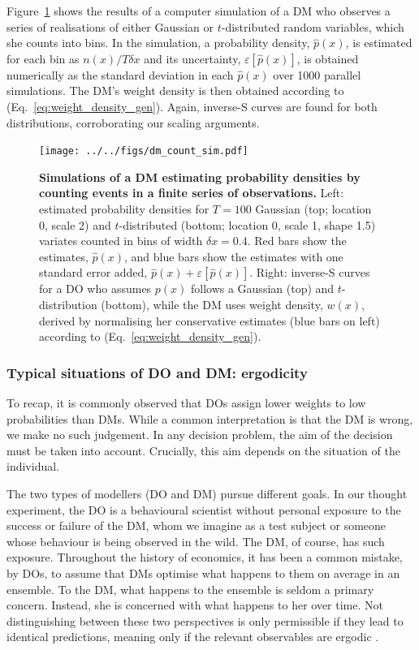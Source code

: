 \documentclass[12pt,letter,timesnewroman]{article}
\newcommand{\eref}[1]{(Eq.~\ref{eq:#1})}
\newcommand{\flabel}[1]{\label{fig:#1}}
\newcommand{\Fref}[1]{Figure~\ref{fig:#1}}
\newcommand{\err}[1]{\varepsilon\left[#1\right]}
\newcommand{\phat}{\hat{p}}
\begin{document}
\Fref{dm_count_sim} shows the results of a computer simulation of a DM who observes a series of realisations of either Gaussian or $t$-distributed random variables, which she counts into bins. In the simulation, a probability density, $\phat(x)$, is estimated for each bin as $n(x)/T\delta x$ and its uncertainty, $\err{\phat(x)}$, is obtained numerically as the standard deviation in each $\phat(x)$ over 1000 parallel simulations. The DM's weight density is then obtained according to \eref{weight_density_gen}. Again, inverse-S curves are found for both distributions, corroborating our scaling arguments.
\begin{figure}[!htb]
\centering
\texttt{[image: ../../figs/dm\_count\_sim.pdf]}
\caption{\textbf{Simulations of a DM estimating probability densities by counting events in a finite series of observations.} Left: estimated probability densities for $T=100$ Gaussian (top; location 0, scale 2) and $t$-distributed (bottom; location 0, scale 1, shape 1.5) variates counted in bins of width $\delta x=0.4$. Red bars show the estimates, $\phat(x)$, and blue bars show the estimates with one standard error added, $\phat(x)+\err{\phat(x)}$. Right: inverse-S curves for a DO who assumes $p(x)$ follows a Gaussian (top) and $t$-distribution (bottom), while the DM uses weight density, $w(x)$, derived by normalising her conservative estimates (blue bars on left) according to \eref{weight_density_gen}.}
\flabel{dm_count_sim}
\end{figure}


\subsubsection*{Typical situations of DO and DM: ergodicity}
To recap, it is commonly observed that DOs assign lower weights to low probabilities than DMs. While a common interpretation is that the DM is wrong, we make no such judgement. In any decision problem, the aim of the decision must be taken into account. Crucially, this aim depends on the situation of the individual.

The two types of modellers (DO and DM) pursue different goals. In our thought experiment, the DO is a behavioural scientist without personal exposure to the success or failure of the DM, whom we imagine as a test subject or someone whose behaviour is being observed in the wild. The DM, of course, has such exposure. Throughout the history of economics, it has been a common mistake, by DOs, to assume that DMs optimise what happens to them on average in an ensemble. To the DM, what happens to the ensemble is seldom a primary concern. Instead, she is concerned with what happens to her over time. Not distinguishing between these two perspectives is only permissible if they lead to identical predictions, meaning only if the relevant observables are ergodic \parencite{Peters2019b}.
\end{document}
